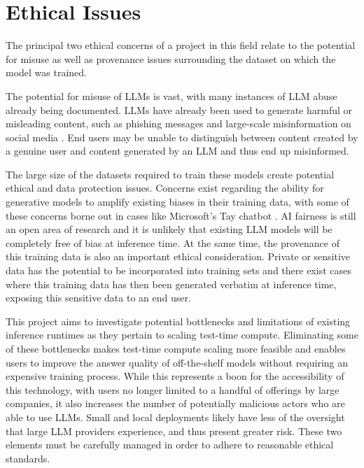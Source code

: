 \documentclass[12pt,twoside]{report}
\begin{document}
\chapter{Ethical Issues} %
The principal two ethical concerns of a project in this field relate to the potential for misuse as well as provenance issues surrounding the dataset on which the model was trained.

The potential for misuse of LLMs is vast, with many instances of LLM abuse already being documented.
LLMs have already been used to generate harmful or misleading content, such as phishing messages \cite{hazell2023spear} and large-scale misinformation on social media \cite{williams2024large}.
End users may be unable to distinguish between content created by a genuine user and content generated by an LLM and thus end up misinformed.

The large size of the datasets required to train these models create potential ethical and data protection issues.
Concerns exist regarding the ability for generative models to amplify existing biases in their training data, with some of these concerns borne out in cases like Microsoft's Tay chatbot \cite{tayMicrosoft}.
AI fairness is still an open area of research \cite{xivuri2021systematic} and it is unlikely that existing LLM models will be completely free of bias at inference time.
At the same time, the provenance of this training data is also an important ethical consideration.
Private or sensitive data has the potential to be incorporated into training sets and there exist cases \cite{nasr2023scalable} where this training data has then been generated verbatim at inference time, exposing this sensitive data to an end user.

This project aims to investigate potential bottlenecks and limitations of existing inference runtimes as they pertain to scaling test-time compute.
Eliminating some of these bottlenecks makes test-time compute scaling more feasible and enables users to improve the answer quality of off-the-shelf models without requiring an expensive training process.
While this represents a boon for the accessibility of this technology, with users no longer limited to a handful of offerings by large companies, it also increases the number of potentially malicious actors who are able to use LLMs.
Small and local deployments likely have less of the oversight that large LLM providers experience, and thus present greater risk.
These two elements must be carefully managed in order to adhere to reasonable ethical standards.
\end{document}
